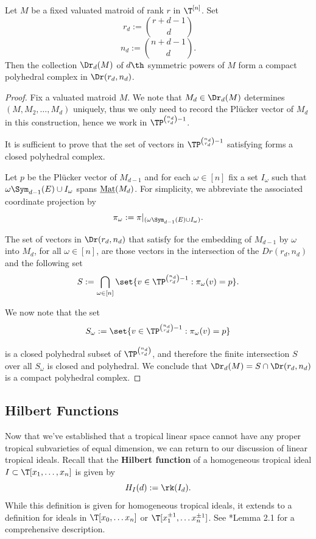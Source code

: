 \begin{proposition}\label{prop:closedcompact}
Let $M$ be a fixed valuated matroid of rank $r$ in $\T^{[n]}$. Set
$$r_d:= \binom{r+d-1}{d}$$
$$n_d:= \binom{n+d-1}{d}.$$
Then the collection $\Dr_d(M)$ of $d\th$ symmetric powers of $M$ form a compact polyhedral complex in $\Dr(r_d,n_d)$.
\end{proposition}
\begin{proof}
Fix a valuated matroid $M$. We note that $M_d\in \Dr_d(M)$ determines $(M,M_2,\dots,M_d)$ uniquely, thus we only need to record the Pl\"ucker vector of $M_d$ in this construction, hence we work in $\TP^{\binom{n_d}{r_d}-1}$. 

It is sufficient to prove that the set of vectors in $\TP^{\binom{n_d}{r_d}-1}$ satisfying  forms a closed polyhedral complex.

Let $p$ be the Pl\"ucker vector of $M_{d-1}$ and for each $\omega\in [n]$ fix a set $I_\omega$ such that $\omega\Sym_{d-1}(E)\cup I_\omega$ spans $\operatorname{\underline{Mat}}(M_d)$. For simplicity, we abbreviate the associated coordinate projection by
$$\pi_\omega: = \pi|_{(\omega \Sym_{d-1}(E)\cup I_\omega)}.$$

The set of vectors in $\Dr(r_d,n_d)$ that satisfy  for the embedding of $M_{d-1}$ by $\omega$ into $M_d$, for all $\omega\in [n]$, are those vectors in the intersection of the $Dr(r_d,n_d)$ and the following set
$$S:=\bigcap_{\omega\in [n]}\set{v\in \TP^{\binom{n_d}{r_d}-1}: \pi_\omega(v) = p}.$$

We now note that the set
$$S_\omega:= \set{v\in \TP^{\binom{n_d}{r_d}-1}: \pi_{\omega}(v) = p}$$

is a closed polyhedral subset of $\TP^{\binom{n_d}{r_d}}$, and therefore the finite intersection $S$ over all $S_\omega$ is closed and polyhedral. We conclude that $\Dr_d(M)=S\cap \Dr(r_d,n_d)$ is a compact polyhedral complex. 
\end{proof}

\subsection{Hilbert Functions}\label{subsec:HF}
    Now that we've established that a tropical linear space cannot have any proper tropical subvarieties of equal dimension, we can return to our discussion of linear tropical ideals. Recall that the \textbf{Hilbert function} of a homogeneous tropical ideal $I\subset \T[x_1,\dots,x_n]$ is given by
    $$H_I(d):= \rk(I_d).$$
    While this definition is given for homogeneous tropical ideals, it extends to a definition for ideals in $\T[x_0,\dots x_n]$ or $\T[x_1^{\pm1},\dots x_n^{\pm1}]$. See \cite{MR20}*{Lemma 2.1} for a comprehensive description. 
    
